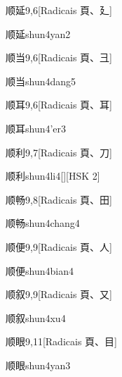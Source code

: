 \begin{entry}{顺延}{9,6}[Radicais ⾴、⼵]
  \begin{phonetics}{顺延}{shun4yan2}
  \end{phonetics}
\end{entry}

\begin{entry}{顺当}{9,6}[Radicais ⾴、⼹]
  \begin{phonetics}{顺当}{shun4dang5}
  \end{phonetics}
\end{entry}

\begin{entry}{顺耳}{9,6}[Radicais ⾴、⽿]
  \begin{phonetics}{顺耳}{shun4'er3}
  \end{phonetics}
\end{entry}

\begin{entry}{顺利}{9,7}[Radicais ⾴、⼑]
  \begin{phonetics}{顺利}{shun4li4}[][HSK 2]
  \end{phonetics}
\end{entry}

\begin{entry}{顺畅}{9,8}[Radicais ⾴、⽥]
  \begin{phonetics}{顺畅}{shun4chang4}
  \end{phonetics}
\end{entry}

\begin{entry}{顺便}{9,9}[Radicais ⾴、⼈]
  \begin{phonetics}{顺便}{shun4bian4}
  \end{phonetics}
\end{entry}

\begin{entry}{顺叙}{9,9}[Radicais ⾴、⼜]
  \begin{phonetics}{顺叙}{shun4xu4}
  \end{phonetics}
\end{entry}

\begin{entry}{顺眼}{9,11}[Radicais ⾴、⽬]
  \begin{phonetics}{顺眼}{shun4yan3}
  \end{phonetics}
\end{entry}

